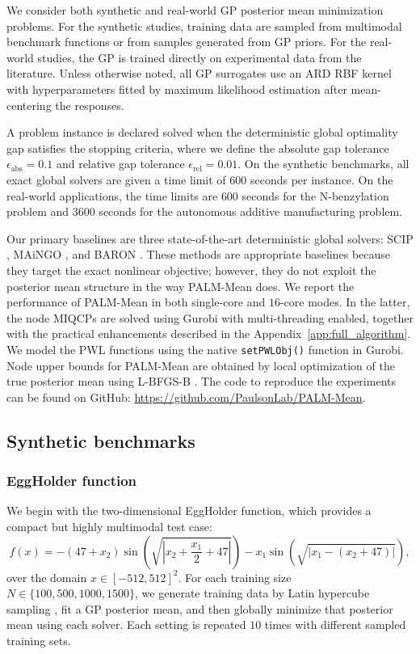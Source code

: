 \documentclass[pdflatex,sn-mathphys-num]{sn-jnl}%
\theoremstyle{thmstyleone}%
\theoremstyle{thmstyletwo}%
\theoremstyle{thmstylethree}%
\begin{document}
We consider both synthetic and real-world GP posterior mean minimization problems. For the synthetic studies, training data are sampled from multimodal benchmark functions or from samples generated from GP priors. For the real-world studies, the GP is trained directly on experimental data from the literature. Unless otherwise noted, all GP surrogates use an ARD RBF kernel with hyperparameters fitted by maximum likelihood estimation after mean-centering the responses.

A problem instance is declared solved when the deterministic global optimality gap satisfies the stopping criteria, where we define the absolute gap tolerance $\epsilon_{\text{abs}}=0.1$ and relative gap tolerance $\epsilon_{\text{rel}}=0.01$. On the synthetic benchmarks, all exact global solvers are given a time limit of $600$ seconds per instance. On the real-world applications, the time limits are $600$ seconds for the N-benzylation problem and $3600$ seconds for the autonomous additive manufacturing problem.

Our primary baselines are three state-of-the-art deterministic global solvers: SCIP \cite{ref:scip}, MAiNGO \cite{ref:maingo}, and BARON \cite{ref:baron}. These methods are appropriate baselines because they target the exact nonlinear objective; however, they do not exploit the posterior mean structure in the way PALM-Mean does. We report the performance of PALM-Mean in both single-core and $16$-core modes. In the latter, the node MIQCPs are solved using Gurobi \cite{gurobi} with multi-threading enabled, together with the practical enhancements described in the Appendix~\ref{app:full_algorithm}. We model the PWL functions using the native \texttt{setPWLObj()} function in Gurobi. Node upper bounds for PALM-Mean are obtained by local optimization of the true posterior mean using L-BFGS-B \cite{zhu1997algorithm}. The code to reproduce the experiments can be found on GitHub: \url{https://github.com/PaulsonLab/PALM-Mean}.

\subsection{Synthetic benchmarks}

\subsubsection{EggHolder function}

We begin with the two-dimensional EggHolder function, which provides a compact but highly multimodal test case:
\[
f(x)=-(47+x_2)\sin\!\left(\sqrt{\left|x_2+\frac{x_1}{2}+47\right|}\right)
-x_1\sin\!\left(\sqrt{\left|x_1-(x_2+47)\right|}\right),
\]
over the domain $x\in[-512,512]^2$. For each training size $N\in\{100,500,1000,1500\}$, we generate training data by Latin hypercube sampling \cite{ref:lhs, mckay2000comparison}, fit a GP posterior mean, and then globally minimize that posterior mean using each solver. Each setting is repeated $10$ times with different sampled training sets.
\end{document}
